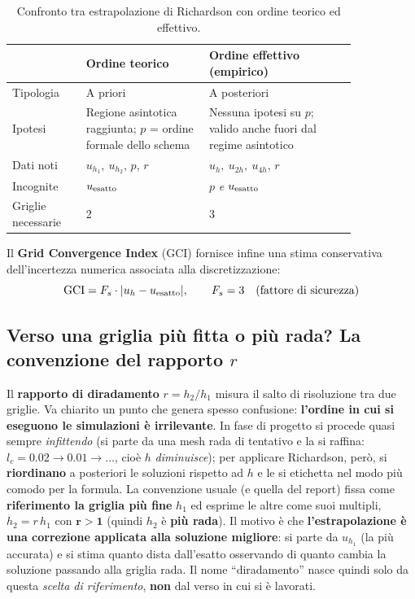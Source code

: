 \begin{table}[H]
\centering
\caption{Confronto tra estrapolazione di Richardson con ordine teorico ed effettivo.}
\renewcommand{\arraystretch}{1.3}
\begin{tabular}{p{0.18\linewidth} p{0.30\linewidth} p{0.36\linewidth}}
\toprule
 & \textbf{Ordine teorico} & \textbf{Ordine effettivo (empirico)} \\
\midrule
Tipologia & A priori & A posteriori \\
Ipotesi & Regione asintotica raggiunta; $p$ = ordine formale dello schema & Nessuna ipotesi su $p$; valido anche fuori dal regime asintotico \\
Dati noti & $u_{h_1},\ u_{h_2}$, $p$, $r$ & $u_h,\ u_{2h},\ u_{4h}$, $r$ \\
Incognite & $u_{\rm esatto}$ & $p$ \emph{e} $u_{\rm esatto}$ \\
Griglie necessarie & 2 & 3 \\
\bottomrule
\end{tabular}
\end{table}

Il \textbf{Grid Convergence Index} (GCI) fornisce infine una stima conservativa
dell'incertezza numerica associata alla discretizzazione:
\begin{equation}
  \text{GCI} = F_s \cdot |u_h - u_{\rm esatto}|, \qquad F_s = 3 \quad \text{(fattore di sicurezza)}
  \label{eq:gci}
\end{equation}

\subsection{Verso una griglia più fitta o più rada? La convenzione del rapporto $r$}

Il \textbf{rapporto di diradamento} $r=h_2/h_1$ misura il salto di risoluzione tra due griglie. Va
chiarito un punto che genera spesso confusione: \textbf{l'ordine in cui si eseguono le simulazioni è
irrilevante}. In fase di progetto si procede quasi sempre \emph{infittendo} (si parte da una mesh
rada di tentativo e la si raffina: $l_c=0.02\to0.01\to\dots$, cioè $h$ \emph{diminuisce}); per
applicare Richardson, però, si \textbf{riordinano} a posteriori le soluzioni rispetto ad $h$ e le si
etichetta nel modo più comodo per la formula. La convenzione usuale (e quella del report) fissa come
\textbf{riferimento la griglia più fine} $h_1$ ed esprime le altre come suoi multipli,
$h_2=r\,h_1$ con $\mathbf{r>1}$ (quindi $h_2$ è \textbf{più rada}). Il motivo è che
\textbf{l'estrapolazione è una correzione applicata alla soluzione migliore}: si parte da $u_{h_1}$
(la più accurata) e si stima quanto dista dall'esatto osservando di quanto cambia la soluzione
passando alla griglia rada. Il nome ``diradamento'' nasce quindi solo da questa \emph{scelta di
riferimento}, \textbf{non} dal verso in cui si è lavorati.

